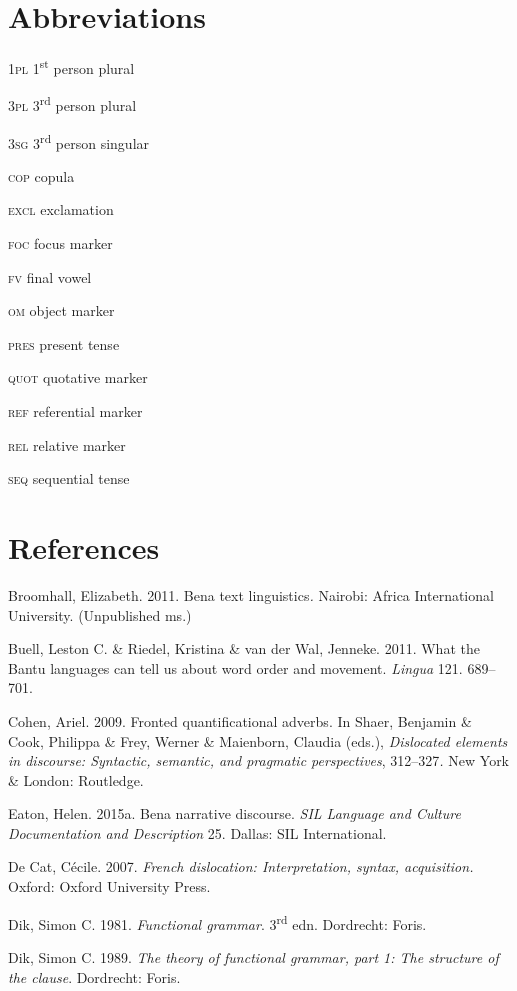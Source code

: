 \documentclass[output=paper]{langsci/langscibook}
\begin{document}
\section{Abbreviations}

\textsc{1pl}  1\textsuperscript{st} person plural

\textsc{3pl}  3\textsuperscript{rd} person plural

\textsc{3sg}  3\textsuperscript{rd} person singular

\textsc{cop}  copula

\textsc{excl}  exclamation

\textsc{foc}  focus marker

\textsc{fv}  final vowel

\textsc{om}  object marker

\textsc{pres}  present tense

\textsc{quot}  quotative marker

\textsc{ref}   referential marker

\textsc{rel}  relative marker

\textsc{seq}  sequential tense

\section{References}

Broomhall, Elizabeth. 2011. Bena text linguistics\textit{.} Nairobi: Africa International University. (Unpublished ms.)

Buell, Leston C. \& Riedel, Kristina \& van der Wal, Jenneke. 2011. What the Bantu languages can tell us about word order and movement. \textit{Lingua} 121. 689–701.

Cohen, Ariel. 2009. Fronted quantificational adverbs. In Shaer, Benjamin \& Cook, Philippa \& Frey, Werner \& Maienborn, Claudia (eds.), \textit{Dislocated elements in discourse: Syntactic, semantic, and pragmatic perspectives}, 312–327\textit{.} New York \& London: Routledge.

Eaton, Helen. 2015a. Bena narrative discourse. \textit{SIL Language and Culture Documentation and Description} 25. Dallas: SIL International.

De Cat, Cécile. 2007. \textit{French dislocation: Interpretation, syntax, acquisition.} Oxford: Oxford University Press.

Dik, Simon C. 1981. \textit{Functional grammar}. 3\textsuperscript{rd} edn. Dordrecht: Foris.

Dik, Simon C. 1989. \textit{The theory of functional grammar, part 1: The structure of the clause}. Dordrecht: Foris.
\end{document}
